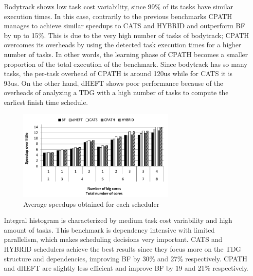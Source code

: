 Bodytrack shows low task cost variability, since 99\% of its tasks have similar execution times.
In this case, contrarily to the previous benchmarks CPATH manages to achieve similar speedups to CATS and HYBRID and outperform BF by up to 15\%.
This is due to the very high number of tasks of bodytrack; CPATH overcomes its overheads by using the detected task execution times for a higher number of tasks.
In other words, the learning phase of CPATH becomes a smaller proportion of the total execution of the benchmark.
Since bodytrack has so many tasks, the per-task overhead of CPATH is around 120us while for CATS it is 93us.
On the other hand, dHEFT shows poor performance because of the overheads of analyzing a TDG with a high number of tasks to compute the earliest finish time schedule.

\begin{figure}[!tr]
	\centering
  	\includegraphics[width=0.7\textwidth]{images/average_all.pdf}
  	\caption{Average speedups obtained for each scheduler}
  	\label{avg_all}
  	\vspace{-0.5cm}
\end{figure}  


Integral histogram is characterized by medium task cost variability and high amount of tasks.
This benchmark is dependency intensive with limited parallelism, which makes scheduling decisions very important.
CATS and HYBRID schedulers achieve the best results since they focus more on the TDG structure and dependencies, improving BF by 30\% and 27\% respectively.
CPATH and dHEFT are slightly less efficient and improve BF by 19 and 21\% respectively.


